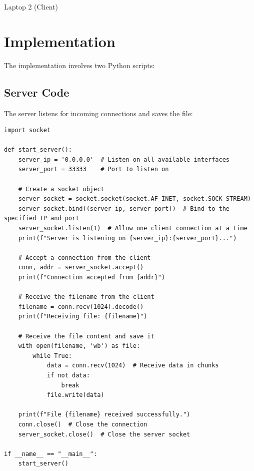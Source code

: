 \documentclass{article}
\begin{document}
\begin{center}
Laptop 2 (Client)
\end{center}
                                
\section{Implementation}
The implementation involves two Python scripts:
\subsection{Server Code}
The server listens for incoming connections and saves the file:
\begin{verbatim}
import socket

def start_server():
    server_ip = '0.0.0.0'  # Listen on all available interfaces
    server_port = 33333    # Port to listen on

    # Create a socket object
    server_socket = socket.socket(socket.AF_INET, socket.SOCK_STREAM)
    server_socket.bind((server_ip, server_port))  # Bind to the specified IP and port
    server_socket.listen(1)  # Allow one client connection at a time
    print(f"Server is listening on {server_ip}:{server_port}...")

    # Accept a connection from the client
    conn, addr = server_socket.accept()
    print(f"Connection accepted from {addr}")

    # Receive the filename from the client
    filename = conn.recv(1024).decode()
    print(f"Receiving file: {filename}")

    # Receive the file content and save it
    with open(filename, 'wb') as file:
        while True:
            data = conn.recv(1024)  # Receive data in chunks
            if not data:
                break
            file.write(data)

    print(f"File {filename} received successfully.")
    conn.close()  # Close the connection
    server_socket.close()  # Close the server socket

if __name__ == "__main__":
    start_server()


\end{verbatim}
\end{document}
